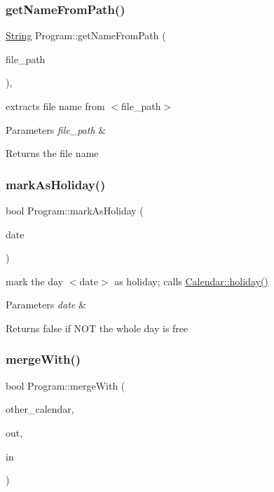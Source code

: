 \subsubsection{\texorpdfstring{get\+Name\+From\+Path()}{getNameFromPath()}}
{\footnotesize\ttfamily \hyperlink{classString}{String} Program\+::get\+Name\+From\+Path (\begin{DoxyParamCaption}\item[{char const $\ast$}]{file\+\_\+path }\end{DoxyParamCaption})\hspace{0.3cm}{\ttfamily [static]}, {\ttfamily [private]}}

extracts file name from $<$file\+\_\+path$>$ 
\begin{DoxyParams}{Parameters}
{\em file\+\_\+path} & \\
\hline
\end{DoxyParams}
\begin{DoxyReturn}{Returns}
the file name 
\end{DoxyReturn}
\mbox{\label{classProgram_ad14086e73ec4aef58c705e3a19089d97}} 
\subsubsection{\texorpdfstring{mark\+As\+Holiday()}{markAsHoliday()}}
{\footnotesize\ttfamily bool Program\+::mark\+As\+Holiday (\begin{DoxyParamCaption}\item[{\hyperlink{classDate}{Date} const \&}]{date }\end{DoxyParamCaption})}

mark the day $<$date$>$ as holiday; calls \hyperlink{classCalendar_aa54f943234aebe06350ae6545804dd0a}{Calendar\+::holiday()} 
\begin{DoxyParams}{Parameters}
{\em date} & \\
\hline
\end{DoxyParams}
\begin{DoxyReturn}{Returns}
false if N\+OT the whole day is free 
\end{DoxyReturn}
\mbox{\label{classProgram_aea58a5865e12fbbb2dda1563e66d092a}} 
\subsubsection{\texorpdfstring{merge\+With()}{mergeWith()}}
{\footnotesize\ttfamily bool Program\+::merge\+With (\begin{DoxyParamCaption}\item[{\hyperlink{classCalendar}{Calendar} $\ast$}]{other\+\_\+calendar,  }\item[{std\+::ostream \&}]{out,  }\item[{std\+::istream \&}]{in }\end{DoxyParamCaption})}

